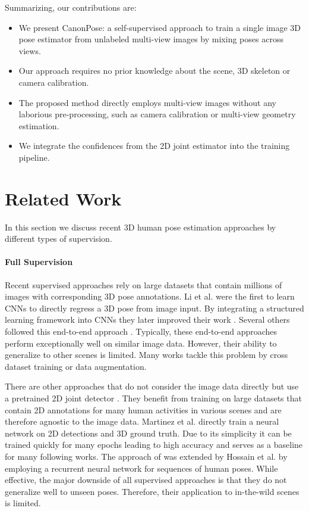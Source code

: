 \documentclass[final]{cvpr}
\begin{document}
Summarizing, our contributions are:
\begin{itemize}
    \item We present CanonPose: a self-supervised approach to train a single image 3D pose estimator from unlabeled multi-view images by mixing poses across views.
    \item Our approach requires no prior knowledge about the scene, 3D skeleton or camera calibration.
    \item The proposed method directly employs multi-view images without any laborious pre-processing, such as camera calibration or multi-view geometry estimation.
    \item We integrate the confidences from the 2D joint estimator into the training pipeline.
\end{itemize}


\section{Related Work}
In this section we discuss recent 3D human pose estimation approaches by different types of supervision.

\paragraph{Full Supervision}
Recent supervised approaches rely on large datasets that contain millions of images with corresponding 3D pose annotations.
Li et al. \cite{Li2014} were the first to learn CNNs to directly regress a 3D pose from image input.
By integrating a structured learning framework into CNNs they later improved their work \cite{Li2015}.
Several others followed this end-to-end approach \cite{Tekin2016BMVC,Park2016,Du2016,VNect_SIGGRAPH2017,Pavlakos2017,lcrnet2017,Tome_2017_CVPR,sun2017compositional,OriNet2018,sun2018integral,zhou2019hemlets,Li_2020_CVPR,Xu_2020_CVPR,kocabas2019vibe}.
Typically, these end-to-end approaches perform exceptionally well on similar image data.
However, their ability to generalize to other scenes is limited.
Many works tackle this problem by cross dataset training or data augmentation.

There are other approaches that do not consider the image data directly but use a pretrained 2D joint detector \cite{chen20173d,Moreno_cvpr2017,fang2017learning,mpii3Dhp2017,pavlakos2018ordinal,XNect_SIGGRAPH2020}.
They benefit from training on large datasets that contain 2D annotations for many human activities in various scenes and are therefore agnostic to the image data.
Martinez et al. \cite{martinez_2017_3Dbaseline} directly train a neural network on 2D detections and 3D ground truth.
Due to its simplicity it can be trained quickly for many epochs leading to high accuracy and serves as a baseline for many following works.
The approach of \cite{martinez_2017_3Dbaseline} was extended by Hossain et al. \cite{Hossain2018} by employing a recurrent neural network for sequences of human poses.
While effective, the major downside of all supervised approaches is that they do not generalize well to unseen poses.
Therefore, their application to in-the-wild scenes is limited.
\end{document}
